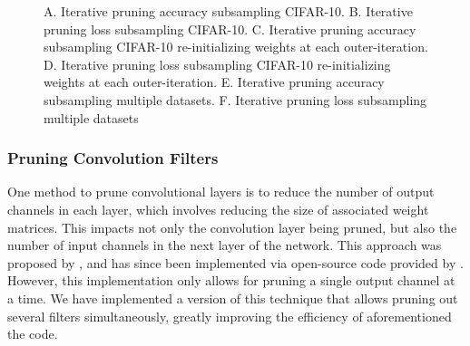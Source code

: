 \documentclass{article}
\begin{document}
\begin{figure}[!t]
{	}
	\caption{A. Iterative pruning accuracy subsampling CIFAR-10. B. Iterative pruning loss subsampling CIFAR-10. C. Iterative pruning accuracy subsampling CIFAR-10 re-initializing weights at each outer-iteration. D. Iterative pruning loss subsampling CIFAR-10 re-initializing weights at each outer-iteration. E. Iterative pruning accuracy subsampling multiple datasets. F. Iterative pruning loss subsampling  multiple datasets}
	\label{f2}
\end{figure}

\subsubsection{Pruning Convolution Filters} \label{PruneFilter}

One method to prune convolutional layers is to reduce the number of output channels in each layer, which involves reducing the size of associated weight matrices. This impacts not only the convolution layer being pruned, but also the number of input channels in the next layer of the network. This approach was proposed by \cite{prune_transfer_learning}, and has since been implemented via open-source code provided by \cite{jacobgilblog}. However, this implementation only allows for pruning a single output channel at a time. We have implemented a version of this technique that allows pruning out several filters simultaneously, greatly improving the efficiency of aforementioned the code.
\end{document}
